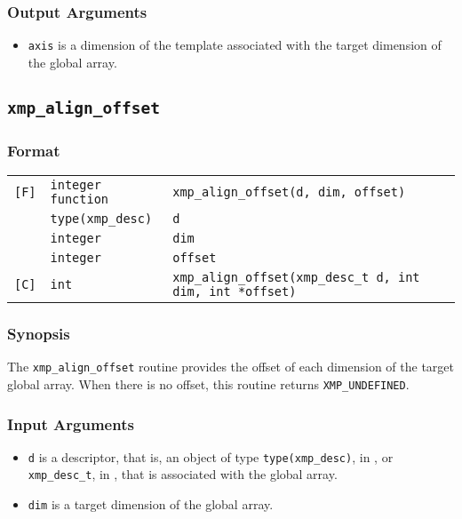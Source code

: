 \subsubsection*{Output Arguments}
\begin{itemize}
 \item {\tt axis} is a dimension of the template associated with the target dimension of the global array.
\end{itemize}


\subsection{\tt xmp\_align\_offset}

\subsubsection*{Format}

\begin{tabular}{lll}

\verb![F]!& {\tt integer function}& {\tt xmp\_align\_offset(d, dim, offset)}\\
          & {\tt type(xmp\_desc)} & {\tt d}\\
          & {\tt integer} & {\tt dim}\\
          & {\tt integer} & {\tt offset}\\

\verb![C]!&  {\tt int}& {\tt xmp\_align\_offset(xmp\_desc\_t d, int dim, int *offset)}\\

\end{tabular}

\subsubsection*{Synopsis}

The {\tt xmp\_align\_offset} routine provides the offset of each dimension of the target global array. When there is no offset, this routine returns {\tt XMP\_UNDEFINED}.


\subsubsection*{Input Arguments}
\begin{itemize}
 \item {\tt d} is a descriptor, that is, an object of type 
       {\tt type(xmp\_desc)}, in {\XMPF}, or {\tt xmp\_desc\_t},
       in {\XMPC}, that is associated with the global array.
 \item {\tt dim} is a target dimension of the global array.
\end{itemize}

